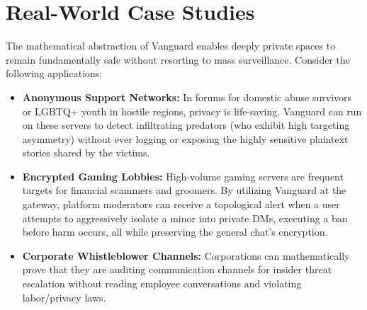 \section{Real-World Case Studies}

The mathematical abstraction of Vanguard enables deeply private spaces to remain fundamentally safe without resorting to mass surveillance. Consider the following applications:

\begin{itemize}
    \item \textbf{Anonymous Support Networks:} In forums for domestic abuse survivors or LGBTQ+ youth in hostile regions, privacy is life-saving. Vanguard can run on these servers to detect infiltrating predators (who exhibit high targeting asymmetry) without ever logging or exposing the highly sensitive plaintext stories shared by the victims.
    \item \textbf{Encrypted Gaming Lobbies:} High-volume gaming servers are frequent targets for financial scammers and groomers. By utilizing Vanguard at the gateway, platform moderators can receive a topological alert when a user attempts to aggressively isolate a minor into private DMs, executing a ban before harm occurs, all while preserving the general chat's encryption.
    \item \textbf{Corporate Whistleblower Channels:} Corporations can mathematically prove that they are auditing communication channels for insider threat escalation without reading employee conversations and violating labor/privacy laws.
\end{itemize}
